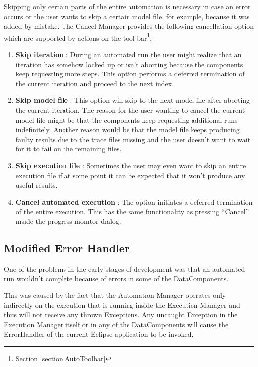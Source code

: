 Skipping only certain parts of the entire automation is necessary in case an error occurs
or the user wants to skip a certain model file, for example, because it was added by mistake.
The Cancel Manager provides the following cancellation option which are supported by
actions on the tool bar\footnote{Section \ref{section:AutoToolbar}}:
\begin{enumerate}
 \item \textbf{Skip iteration} : During an automated run the user might realize that an
iteration has somehow locked up or isn't aborting because the components keep requesting more
steps. This option performs a deferred termination of the current iteration
and proceed to the next index.
 \item \textbf{Skip model file} : This option will skip to the next model file after aborting 
the current iteration. The reason for the user wanting to cancel the current model file 
might be that the components keep requesting additional runs indefinitely. 
Another reason would be that the model file keeps producing faulty results
due to the trace files missing and the user doesn't want to wait for it to fail on the remaining files.
 \item \textbf{Skip execution file} : Sometimes the user may even want to skip an entire execution
file if at some point it can be expected that it won't produce any useful results.
 \item \textbf{Cancel automated execution} : The option initiates a deferred
termination of the entire execution. This has the same functionality as pressing ``Cancel'' inside the 
progress monitor dialog.
\end{enumerate}

\subsection{Modified Error Handler}
\label{section:ErrorHandler}
One of the problems in the early stages of development was that an automated run wouldn't complete
because of errors in some of the DataComponents.

This was caused by the fact that the Automation Manager operates only indirectly on the execution
that is running inside the Execution Manager and thus will not receive any thrown Exceptions.
Any uncaught Exception in the Execution Manager itself or in any of the DataComponents will
cause the ErrorHandler of the current Eclipse application to be invoked.

